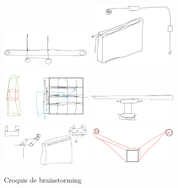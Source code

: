 \begin{figure}[H]
  \centering
  \includegraphics[width=0.4\textwidth]{croquis/boucle}
  \hspace{2em}
  \includegraphics[width=0.4\textwidth]{croquis/boucle_dessus}
  \vspace{2em}
  \includegraphics[width=0.4\textwidth]{croquis/hotel}
  \hspace{2em}
  \includegraphics[width=0.4\textwidth]{croquis/palan}
  \vspace{2em}
  \includegraphics[width=0.4\textwidth]{croquis/roller_coaster}
  \hspace{2em}
  \includegraphics[width=0.4\textwidth]{croquis/suspension}
  \caption{Croquis de brainstorming}
  \label{fig:croquis}
\end{figure}

